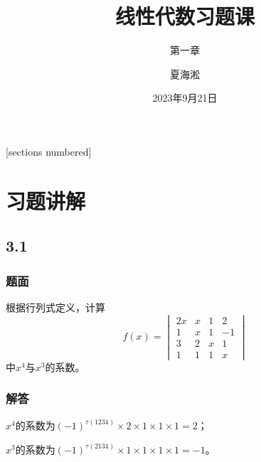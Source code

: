 \documentclass[10pt,xcolor=svgnames]{beamer} %
\title{线性代数习题课}
\author{夏海淞}
\subtitle{第一章}
\institute[复旦大学]{计算机科学技术学院\\ 复旦大学}
\date{2023年9月21日}
\begin{document}
{
\maketitle
}%


\begin{frame}
    [sections numbered] %
    \tableofcontents[hideallsubsections] %
\end{frame}

\section{习题讲解}

\subsection*{3.1}
\begin{frame}
    \frametitle{题面}
    根据行列式定义，计算
    \begin{equation*}
        f(x)=
        \begin{vmatrix}
            2x & x & 1 & 2  \\
            1  & x & 1 & -1 \\
            3  & 2 & x & 1  \\
            1  & 1 & 1 & x
        \end{vmatrix}
    \end{equation*}
    中\(x^4\)与\(x^3\)的系数。
\end{frame}
\begin{frame}
    \frametitle{解答}
    \(x^4\)的系数为\((-1)^{\tau(1234)}\times2\times1\times1\times1=2\)；

    \(x^3\)的系数为\((-1)^{\tau(2134)}\times1\times1\times1\times1=-1\)。
\end{frame}
\end{document}
